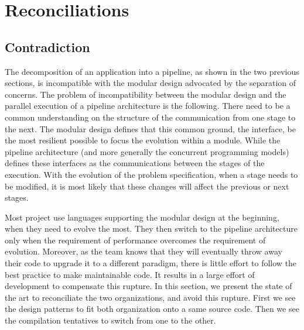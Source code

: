 \section{Reconciliations} \label{chapter3:reconciliations}

\subsection{Contradiction}

The decomposition of an application into a pipeline, as shown in the two previous sections, is incompatible with the modular design advocated by the separation of concerns.
The problem of incompatibility between the modular design and the parallel execution of a pipeline architecture is the following.
There need to be a common understanding on the structure of the communication from one stage to the next.
The modular design defines that this common ground, the interface, be the most resilient possible to focus the evolution within a module.
While the pipeline architecture (and more generally the concurrent programming models) defines these interfaces as the communications between the stages of the execution.
With the evolution of the problem specification, when a stage needs to be modified, it is most likely that these changes will affect the previous or next stages.

Most project use languages supporting the modular design at the beginning, when they need to evolve the most.
They then switch to the pipeline architecture only when the requirement of performance overcomes the requirement of evolution.
Moreover, as the team knows that they will eventually throw away their code to upgrade it to a different paradigm, there is little effort to follow the best practice to make maintainable code.
It results in a large effort of development to compensate this rupture.
In this section, we present the state of the art to reconciliate the two organizations, and avoid this rupture.
First we see the design patterns to fit both organization onto a same source code.
Then we see the compilation tentatives to switch from one to the other.